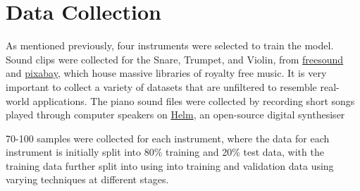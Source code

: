 \documentclass[class=report,11pt,crop=false]{standalone}
\begin{document}
\ifstandalone
\tableofcontents
\fi
\section{Data Collection \label{ch: data_collection}}

As mentioned previously, four instruments were selected to train the model. Sound clips were collected for the Snare, Trumpet, and Violin, from \href{https://freesound.org/}{freesound} and \href{https://pixabay.com/}{pixabay}, which house massive libraries of royalty free music. It is very important to collect a variety of datasets that are unfiltered to resemble real-world applications. The piano sound files were collected by recording short songs played through computer speakers on \href{https://tytel.org/helm/}{Helm}, an open-source digital synthesiser

70-100 samples were collected for each instrument, where the data for each instrument is initially split into 80\% training and 20\% test data, with the training data further split into using into training and validation data using varying techniques at different stages.

\ifstandalone

\printnoidxglossary[type=\acronymtype,nonumberlist]
\fi
\end{document}
